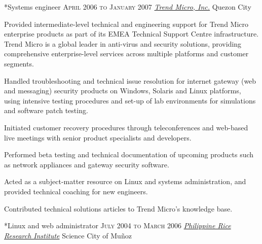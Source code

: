 \documentclass[10pt, a4paper, final]{article}
\begin{document}
\begin{section}
\begin{subsection}
\begin{compactitem}
    \end{compactitem}
  \end{subsection}
  \vspace{2em}

  \begin{subsection}*{Systems engineer \hfill\textsc{April 2006 to January 2007}}
    \href{http://www.trendmicro.com}{\textit{Trend Micro, Inc.}} \hfill Quezon City
    \vspace{1em}

    Provided intermediate-level technical and engineering support for Trend Micro enterprise products as part of its EMEA Technical Support Centre infrastructure. Trend Micro is a global leader in anti-virus and security solutions, providing comprehensive enterprise-level services across multiple platforms and customer segments.
    \vspace{1em}
    \begin{compactitem}
      \item Handled troubleshooting and technical issue resolution for internet gateway (web and messaging) security products on Windows, Solaris and Linux platforms, using intensive testing procedures and set-up of lab environments for simulations and software patch testing.
      \item Initiated customer recovery procedures through teleconferences and web-based live meetings with senior product specialists and developers.
      \item Performed beta testing and technical documentation of upcoming products such as network appliances and gateway security software.
      \item Acted as a subject-matter resource on Linux and systems administration, and provided technical coaching for new engineers.
      \item Contributed technical solutions articles to Trend Micro's knowledge base.
      
    \end{compactitem}
  \end{subsection}
  \vspace{2em}

  \begin{subsection}*{Linux and web administrator \hfill\textsc{July 2004 to March 2006}}
    \href{http://www.philrice.gov.ph}{\textit{Philippine Rice Research Institute}} \hfill Science City of Mu{\~n}oz
    \vspace{1em}


\end{subsection}
\end{section}
\end{document}
